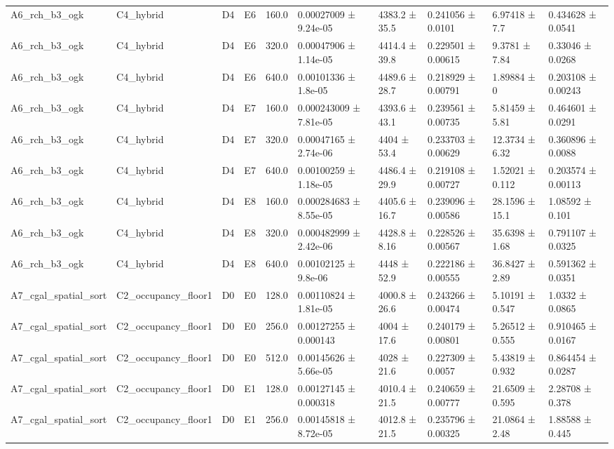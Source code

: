 \begin{table}
\begin{tabular}{llllllllll}
A6\_rch\_b3\_ogk & C4\_hybrid & D4 & E6 & 160.0 & 0.00027009 ± 9.24e-05 & 4383.2 ± 35.5 & 0.241056 ± 0.0101 & 6.97418 ± 7.7 & 0.434628 ± 0.0541 \\
A6\_rch\_b3\_ogk & C4\_hybrid & D4 & E6 & 320.0 & 0.00047906 ± 1.14e-05 & 4414.4 ± 39.8 & 0.229501 ± 0.00615 & 9.3781 ± 7.84 & 0.33046 ± 0.0268 \\
A6\_rch\_b3\_ogk & C4\_hybrid & D4 & E6 & 640.0 & 0.00101336 ± 1.8e-05 & 4489.6 ± 28.7 & 0.218929 ± 0.00791 & 1.89884 ± 0 & 0.203108 ± 0.00243 \\
A6\_rch\_b3\_ogk & C4\_hybrid & D4 & E7 & 160.0 & 0.000243009 ± 7.81e-05 & 4393.6 ± 43.1 & 0.239561 ± 0.00735 & 5.81459 ± 5.81 & 0.464601 ± 0.0291 \\
A6\_rch\_b3\_ogk & C4\_hybrid & D4 & E7 & 320.0 & 0.00047165 ± 2.74e-06 & 4404 ± 53.4 & 0.233703 ± 0.00629 & 12.3734 ± 6.32 & 0.360896 ± 0.0088 \\
A6\_rch\_b3\_ogk & C4\_hybrid & D4 & E7 & 640.0 & 0.00100259 ± 1.18e-05 & 4486.4 ± 29.9 & 0.219108 ± 0.00727 & 1.52021 ± 0.112 & 0.203574 ± 0.00113 \\
A6\_rch\_b3\_ogk & C4\_hybrid & D4 & E8 & 160.0 & 0.000284683 ± 8.55e-05 & 4405.6 ± 16.7 & 0.239096 ± 0.00586 & 28.1596 ± 15.1 & 1.08592 ± 0.101 \\
A6\_rch\_b3\_ogk & C4\_hybrid & D4 & E8 & 320.0 & 0.000482999 ± 2.42e-06 & 4428.8 ± 8.16 & 0.228526 ± 0.00567 & 35.6398 ± 1.68 & 0.791107 ± 0.0325 \\
A6\_rch\_b3\_ogk & C4\_hybrid & D4 & E8 & 640.0 & 0.00102125 ± 9.8e-06 & 4448 ± 52.9 & 0.222186 ± 0.00555 & 36.8427 ± 2.89 & 0.591362 ± 0.0351 \\
A7\_cgal\_spatial\_sort & C2\_occupancy\_floor1 & D0 & E0 & 128.0 & 0.00110824 ± 1.81e-05 & 4000.8 ± 26.6 & 0.243266 ± 0.00474 & 5.10191 ± 0.547 & 1.0332 ± 0.0865 \\
A7\_cgal\_spatial\_sort & C2\_occupancy\_floor1 & D0 & E0 & 256.0 & 0.00127255 ± 0.000143 & 4004 ± 17.6 & 0.240179 ± 0.00801 & 5.26512 ± 0.555 & 0.910465 ± 0.0167 \\
A7\_cgal\_spatial\_sort & C2\_occupancy\_floor1 & D0 & E0 & 512.0 & 0.00145626 ± 5.66e-05 & 4028 ± 21.6 & 0.227309 ± 0.0057 & 5.43819 ± 0.932 & 0.864454 ± 0.0287 \\
A7\_cgal\_spatial\_sort & C2\_occupancy\_floor1 & D0 & E1 & 128.0 & 0.00127145 ± 0.000318 & 4010.4 ± 21.5 & 0.240659 ± 0.00777 & 21.6509 ± 0.595 & 2.28708 ± 0.378 \\
A7\_cgal\_spatial\_sort & C2\_occupancy\_floor1 & D0 & E1 & 256.0 & 0.00145818 ± 8.72e-05 & 4012.8 ± 21.5 & 0.235796 ± 0.00325 & 21.0864 ± 2.48 & 1.88588 ± 0.445 \\

\end{tabular}
\end{table}
